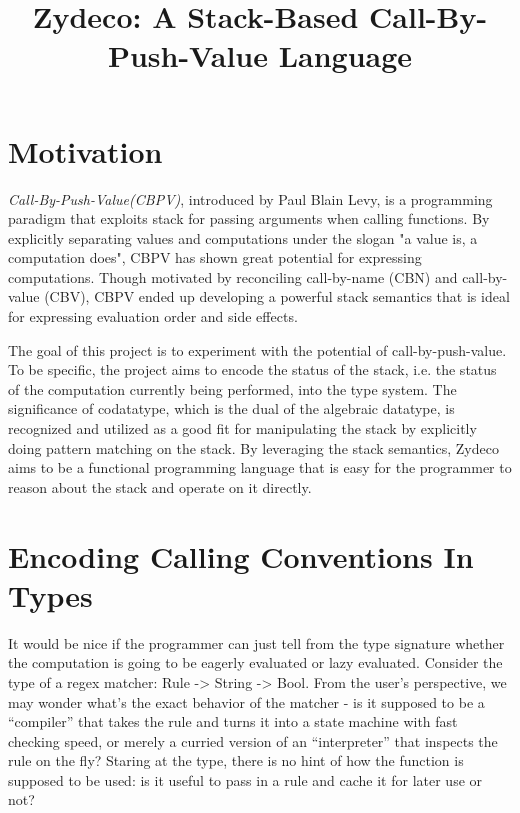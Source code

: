 \documentclass[acmsmall,nonacm]{acmart}
\title{Zydeco: A Stack-Based Call-By-Push-Value Language}
\begin{document}
\renewcommand{\thesection}{\Alph{section}}

\maketitle

\section{Motivation}

\textit{Call-By-Push-Value(CBPV)}, introduced by Paul Blain Levy, is a programming paradigm that exploits stack for passing arguments when calling functions. By explicitly separating values and computations under the slogan "a value is, a computation does", CBPV has shown great potential for expressing computations. Though motivated by reconciling call-by-name (CBN) and call-by-value (CBV), CBPV ended up developing a powerful stack semantics that is ideal for expressing evaluation order and side effects.

The goal of this project is to experiment with the potential of call-by-push-value. To be specific, the project aims to encode the status of the stack, i.e. the status of the computation currently being performed, into the type system. The significance of codatatype, which is the dual of the algebraic datatype, is recognized and utilized as a good fit for manipulating the stack by explicitly doing pattern matching on the stack. By leveraging the stack semantics, Zydeco aims to be a functional programming language that is easy for the programmer to reason about the stack and operate on it directly.

\section{Encoding Calling Conventions In Types}

It would be nice if the programmer can just tell from the type signature whether the computation is going to be eagerly evaluated or lazy evaluated. Consider the type of a regex matcher: Rule -> String -> Bool. From the user's perspective, we may wonder what's the exact behavior of the matcher - is it supposed to be a ``compiler'' that takes the rule and turns it into a state machine with fast checking speed, or merely a curried version of an ``interpreter'' that inspects the rule on the fly? Staring at the type, there is no hint of how the function is supposed to be used: is it useful to pass in a rule and cache it for later use or not?
\end{document}
